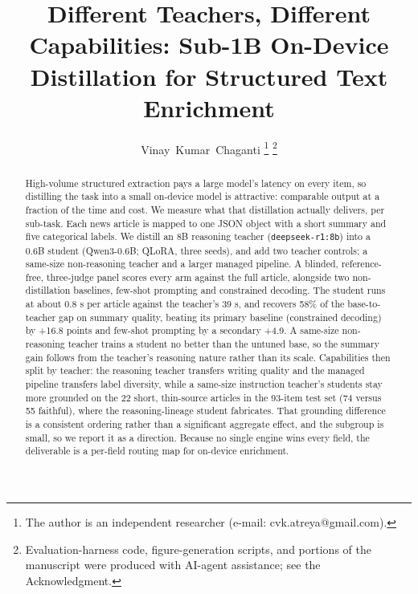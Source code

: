 \documentclass[10pt,journal]{IEEEtran}
\begin{document}
\title{Different Teachers, Different Capabilities: Sub-1B On-Device Distillation for Structured Text Enrichment}

\author{Vinay~Kumar~Chaganti%
\thanks{The author is an independent researcher (e-mail: cvk.atreya@gmail.com).}%
\thanks{Evaluation-harness code, figure-generation scripts, and portions of the manuscript were produced with AI-agent assistance; see the Acknowledgment.}}


\maketitle

\begin{abstract}
High-volume structured extraction pays a large model's latency on every item, so distilling the task into a small on-device model is attractive: comparable output at a fraction of the time and cost. We measure what that distillation actually delivers, per sub-task. Each news article is mapped to one JSON object with a short summary and five categorical labels. We distill an 8B reasoning teacher (\texttt{deepseek-r1:8b}) into a 0.6B student (Qwen3-0.6B; QLoRA, three seeds), and add two teacher controls: a same-size non-reasoning teacher and a larger managed pipeline. A blinded, reference-free, three-judge panel scores every arm against the full article, alongside two non-distillation baselines, few-shot prompting and constrained decoding. The student runs at about 0.8 s per article against the teacher's 39 s, and recovers 58\% of the base-to-teacher gap on summary quality, beating its primary baseline (constrained decoding) by +16.8 points and few-shot prompting by a secondary +4.9. A same-size non-reasoning teacher trains a student no better than the untuned base, so the summary gain follows from the teacher's reasoning nature rather than its scale. Capabilities then split by teacher: the reasoning teacher transfers writing quality and the managed pipeline transfers label diversity, while a same-size instruction teacher's students stay more grounded on the 22 short, thin-source articles in the 93-item test set (74 versus 55 faithful), where the reasoning-lineage student fabricates. That grounding difference is a consistent ordering rather than a significant aggregate effect, and the subgroup is small, so we report it as a direction. Because no single engine wins every field, the deliverable is a per-field routing map for on-device enrichment.
\end{abstract}
\end{document}
